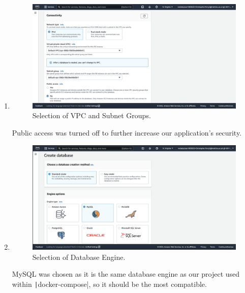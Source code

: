 \begin{enumerate}
    \item
    \begin{figure}[H]
        \centering
        \includegraphics[width=\textwidth]{resources/rds/rds-connectivity-1}
        \caption{Selection of VPC and Subnet Groups.}
        \label{fig:rds-connecting}
    \end{figure}\nolinebreak
    \nolinebreak
    Public access was turned off to further increase our application's security.

    \item
    \begin{figure}[H]
        \centering
        \includegraphics[width=\textwidth]{resources/rds/rds-create-engine}
        \caption{Selection of Database Engine.}
        \label{fig:rds-engine}
    \end{figure}\nolinebreak
    MySQL was chosen as it is the same database engine as our project used within \texttt|docker-compose|, so it should be the most compatible.


\end{enumerate}
